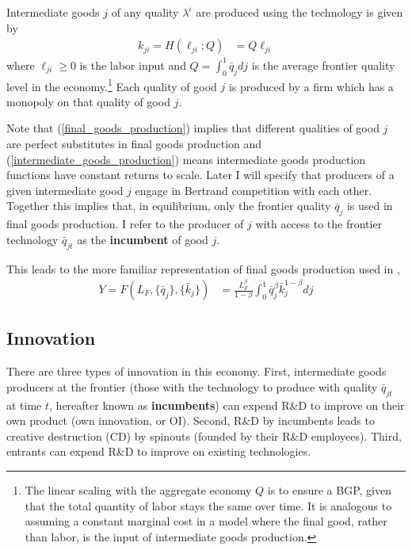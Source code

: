 \documentclass[11pt,english]{article}
\theoremstyle{remark}
\begin{document}
Intermediate goods $j$ of any quality $\lambda^i$ are produced using the technology is given by
\begin{align}
k_{ji} = H(\ell_{ji};Q) &= Q \ell_{ji} \label{intermediate_goods_production}
\end{align}
where $\ell_{ji} \ge 0$ is the labor input and $Q = \int_0^1 \bar{q}_{j} dj$ is the average frontier quality level in the economy.\footnote{The linear scaling with the aggregate economy $Q$ is to ensure a BGP, given that the total quantity of labor stays the same over time. It is analogous to assuming a constant marginal cost in a model where the final good, rather than labor, is the input of intermediate goods production.} Each quality of good $j$ is produced by a firm which has a monopoly on that quality of good $j$. 

Note that (\ref{final_goods_production}) implies that different qualities of good $j$ are perfect substitutes in final goods production and (\ref{intermediate_goods_production}) means intermediate goods production functions have constant returns to scale. Later I will specify that producers of a given intermediate good $j$ engage in Bertrand competition with each other. Together this implies that, in equilibrium, only the frontier quality $\bar{q}_{j}$ is used in final goods production. I refer to the producer of $j$ with access to the frontier technology $\bar{q}_{jt}$ as the \textbf{incumbent} of good $j$. 

This leads to the more familiar representation of final goods production used in  \cite{acemoglu_introduction_2009},
\begin{align}
	Y = F(L_F,\{\bar{q}_j\},\{\bar{k}_j\}) &= \frac{L_F^{\beta}}{1-\beta} \int_0^1 \bar{q}_j^{\beta} \bar{k}_j^{1-\beta} dj  \label{eq_final_goods_production}
\end{align}

\subsection{Innovation}\label{subsec:innovation}

There are three types of innovation in this economy. First, intermediate goods producers at the frontier (those with the technology to produce with quality $\bar{q}_{jt}$ at time $t$, hereafter known as \textbf{incumbents}) can expend R\&D to improve on their own product (own innovation, or OI). Second, R\&D by incumbents leads to creative destruction (CD) by spinouts (founded by their R\&D employees). Third, entrants can expend R\&D to improve on existing technologies.
\end{document}
